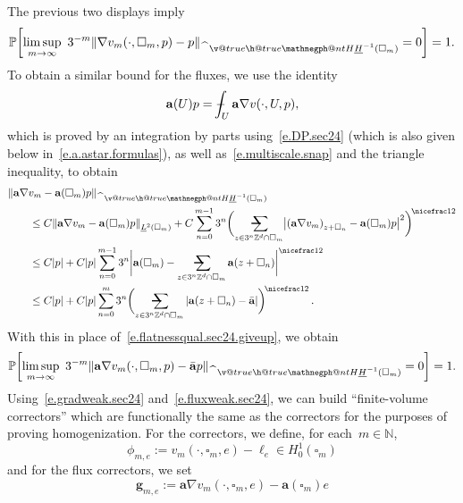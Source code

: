 \documentclass[11pt,twoside]{article} %
\makeatletter
\let\oldsquare\square %
\renewcommand{\square}{\oldsquare}
\numberwithin{equation}{section}
\theoremstyle{definition}
\let\originalleft\left
\let\originalright\right
\renewcommand{\left}{\mathopen{}\mathclose\bgroup\originalleft}
\renewcommand{\right}{\aftergroup\egroup\originalright}
\newcommand*{\N}{\ensuremath{\mathbb{N}}}
\newcommand*{\Zd}{\ensuremath{\mathbb{Z}^d}}
\renewcommand*{\hat}{\widehat}
\newcommand{\g}{\mathbf{g}}
\renewcommand{\a}{\mathbf{a}}
\newcommand{\ahom}{\bar{\a}}
\newcommand{\cu}{\square}
\renewcommand{\P}{\mathbb{P}}
\newcommand{\avsum}{\mathop{\mathpalette\avsuminner\relax}\displaylimits}
\newcommand\avsuminner[2]{%
  {\sbox0{$\m@th#1\sum$}%
   \vphantom{\usebox0}%
   \ooalign{%
     \hidewidth
     \smash{\,\rule[.23em]{8.8pt}{1.1pt} \relax}%
     \hidewidth\cr
   ~$\m@th#1\sum$\cr
   }%
  }%
}
\def\Xint#1{\mathchoice
{\XXint\displaystyle\textstyle{#1}}%
{\XXint\textstyle\scriptstyle{#1}}%
{\XXint\scriptstyle\scriptscriptstyle{#1}}%
{\XXint\scriptscriptstyle\scriptscriptstyle{#1}}%
\!\int}
\def\XXint#1#2#3{{\setbox0=\hbox{$#1{#2#3}{\int}$}
\vcenter{\hbox{$#2#3$}}\kern-.5\wd0}}
\def\fint{\Xint-}
\newcommand{\negphantom}{\v@true\h@true\negph@nt}
\newcommand{\negph@nt}{\ifmmode\expandafter\mathpalette 
  \expandafter\mathnegph@nt\else\expandafter\makenegph@nt\fi}
\newcommand{\makenegph@nt}[1]{%
  \setbox\z@\hbox{\color@begingroup#1\color@endgroup}\finnegph@nt}
\newcommand{\finnegph@nt}{%
  \setbox\tw@\null 
  \ifv@ \ht\tw@\ht\z@\dp\tw@\dp\z@\fi \ifh@\wd\tw@-\wd\z@\fi\box\tw@}
\newcommand{\mathnegph@nt}[2]{%
  \setbox\z@\hbox{$\m@th #1{#2}$}\finnegph@nt}
\newcommand{\Hminusul}{\hat{\phantom{H}}\negphantom{H}\underline{H}^{-1}}
\makeatother
\begin{document}
The previous two displays imply
\begin{equation}
\label{e.gradweak.sec24}
\P \biggl[
\limsup_{m\to\infty} \ 
3^{-m} \left\| \nabla v_m(\cdot,\cu_m,p) - p \right\|_{\Hminusul(\cu_m)} = 0
\biggr] = 1. 
\end{equation}
To obtain a similar bound for the fluxes, we use the identity 
\begin{equation}
\label{e.flux.identity.sec24}
\a(U) p = \fint_{U} \a\nabla v(\cdot,U,p),
\end{equation}
which is proved by an integration by parts using~\eqref{e.DP.sec24} (which is also given below in~\eqref{e.a.astar.formulas}), 
as well as~\eqref{e.multiscale.snap} and the triangle inequality, to obtain
\begin{align}
\lefteqn{
\left\| \a \nabla v_m - \a(\cu_m) p \right\|_{\Hminusul(\cu_m)}
} \qquad & 
\notag \\ &
\leq
C
\left\| \a \nabla v_m - \a(\cu_m) p \right\|_{ \underline{L}^2(\cu_m)} 
+
C 
\sum_{n=0}^{{m-1}} 3^{n} 
\biggl( \avsum_{z\in 3^n\Zd\cap \cu_{m}} 
\left| \left( \a \nabla v_m  \right)_{z+\cu_n} - \a(\cu_m) p \right|^2 \biggr)^{\!\nicefrac12}
\notag \\ & 
\leq C|p|
+ 
C|p|
\sum_{n=0}^{{m-1}} 3^{n} 
\biggl| 
 \a(\cu_m)-
\avsum_{z\in 3^n\Zd\cap \cu_{m}} 
\a(z+\cu_n)
\biggr|^{\nicefrac12}
\label{e.flatnessqual.flux.sec24} \\ & 
\leq 
C|p| 
+ 
C |p|
\sum_{n=0}^{{m}} 3^{n} 
\biggl( \avsum_{z\in 3^n\Zd\cap \cu_{m}} 
| \a(z+\cu_n)
-
\ahom |
\biggr)^{\!\nicefrac12}
\label{e.flatnessqual.flux.sec24.giveup}
\,.
\end{align}
With this in place of~\eqref{e.flatnessqual.sec24.giveup}, we obtain 
\begin{equation}
\label{e.fluxweak.sec24}
\P \biggl[
\limsup_{m\to\infty} \ 
3^{-m} \left\| \a \nabla v_m(\cdot,\cu_m,p) - \ahom p \right\|_{\Hminusul(\cu_m)} = 0
\biggr] = 1. 
\end{equation}
Using~\eqref{e.gradweak.sec24} and~\eqref{e.fluxweak.sec24}, we can build ``finite-volume correctors'' which are functionally the same as the correctors for the purposes of proving homogenization. For the correctors, we define, for each~$m\in\N$, 
\begin{equation}
\label{e.FVC.def}
\phi_{m,e} := v_m(\cdot,\cu_m,e) - \ell_e \in H^1_0(\cu_m)
\end{equation}
and for the flux correctors, we set
\begin{equation*}
\g_{m,e} := \a \nabla v_m(\cdot,\cu_m,e) - \a(\cu_m) e
\end{equation*}
\end{document}
